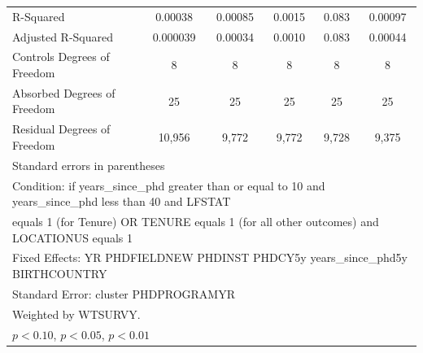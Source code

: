 \begin{table}[htbp]
\begin{tabular}{l*{5}{c}}
R-Squared&     0.00038         &     0.00085         &      0.0015         &       0.083         &     0.00097         \\
Adjusted R-Squared&    0.000039         &     0.00034         &      0.0010         &       0.083         &     0.00044         \\
Controls Degrees of Freedom&           8         &           8         &           8         &           8         &           8         \\
Absorbed Degrees of Freedom&          25         &          25         &          25         &          25         &          25         \\
Residual Degrees of Freedom&      10,956         &       9,772         &       9,772         &       9,728         &       9,375         \\
\hline\hline
\multicolumn{6}{l}{\footnotesize Standard errors in parentheses}\\
\multicolumn{6}{l}{\footnotesize Condition: if years\_since\_phd greater than or equal to 10 and years\_since\_phd less than 40 and LFSTAT}\\
\multicolumn{6}{l}{\footnotesize equals 1 (for Tenure) OR TENURE equals 1 (for all other outcomes) and LOCATIONUS equals 1}\\
\multicolumn{6}{l}{\footnotesize Fixed Effects: YR PHDFIELDNEW PHDINST PHDCY5y years\_since\_phd5y BIRTHCOUNTRY}\\
\multicolumn{6}{l}{\footnotesize Standard Error: cluster PHDPROGRAMYR}\\
\multicolumn{6}{l}{\footnotesize Weighted by WTSURVY.}\\
\multicolumn{6}{l}{\footnotesize \sym{*} \(p<0.10\), \sym{**} \(p<0.05\), \sym{***} \(p<0.01\)}\\
\end{tabular}
\end{table}
